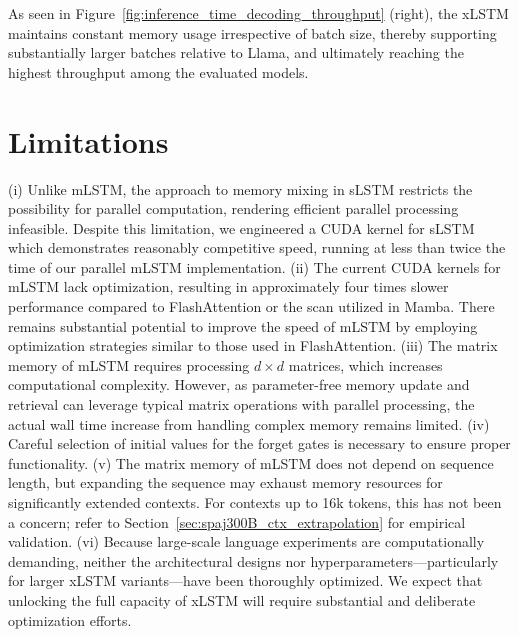 As seen in Figure~\ref{fig:inference_time_decoding_throughput} (right), the xLSTM maintains constant memory usage irrespective of batch size, thereby supporting substantially larger batches relative to Llama, and ultimately reaching the highest throughput among the evaluated models.

\section{Limitations}

(i) Unlike mLSTM, the approach to memory mixing in sLSTM restricts the possibility for parallel computation, rendering efficient parallel processing infeasible. Despite this limitation, we engineered a CUDA kernel for sLSTM which demonstrates reasonably competitive speed, running at less than twice the time of our parallel mLSTM implementation. (ii) The current CUDA kernels for mLSTM lack optimization, resulting in approximately four times slower performance compared to FlashAttention or the scan utilized in Mamba. There remains substantial potential to improve the speed of mLSTM by employing optimization strategies similar to those used in FlashAttention. (iii) The matrix memory of mLSTM requires processing $d \times d$ matrices, which increases computational complexity. However, as parameter-free memory update and retrieval can leverage typical matrix operations with parallel processing, the actual wall time increase from handling complex memory remains limited. (iv) Careful selection of initial values for the forget gates is necessary to ensure proper functionality. (v) The matrix memory of mLSTM does not depend on sequence length, but expanding the sequence may exhaust memory resources for significantly extended contexts. For contexts up to 16k tokens, this has not been a concern; refer to Section~\ref{sec:spaj300B_ctx_extrapolation} for empirical validation. (vi) Because large-scale language experiments are computationally demanding, neither the architectural designs nor hyperparameters—particularly for larger xLSTM variants—have been thoroughly optimized. We expect that unlocking the full capacity of xLSTM will require substantial and deliberate optimization efforts.

